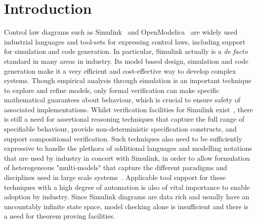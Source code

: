 \section{Introduction} \label{sec:intro}
Control law diagrams such as Simulink~\cite{Simulink} and OpenModelica~\cite{openmodelica} are widely used industrial languages and tool-sets for expressing control laws, including support for simulation and code generation. In particular, Simulink actually is a \emph{de facto} standard in many areas in industry. Its model based design, simulation and code generation make it a very efficient and cost-effective way to develop complex systems. Though empirical analysis through simulation is an important technique to explore and refine models, only formal verification can make specific mathematical guarantees about behaviour, which is crucial to ensure safety of associated implementations. Whilst verification facilities for Simulink exist~\cite{Arthan2000, Roy2011, Bostroem2016, Caspi2003, Cavalcanti2005a, Preoteasa2017}, there is still a need for assertional reasoning techniques that capture the full range of specifiable behaviour, provide non-deterministic specification constructs, and support compositional verification. Such techniques also need to be sufficiently expressive to handle the plethora of additional languages and modelling notations that are used by industry in concert with Simulink, in order to allow formulation of heterogeneous "multi-models" that capture the different paradigms and disciplines used in large scale systems~\cite{Zeyda2018}. Applicable tool support for these techniques with a high degree of automation is also of vital importance to enable adoption by industry. Since Simulink diagrams are data rich and usually have an uncountably infinite state space, model checking alone is insufficient and there is a need for theorem proving facilities.

